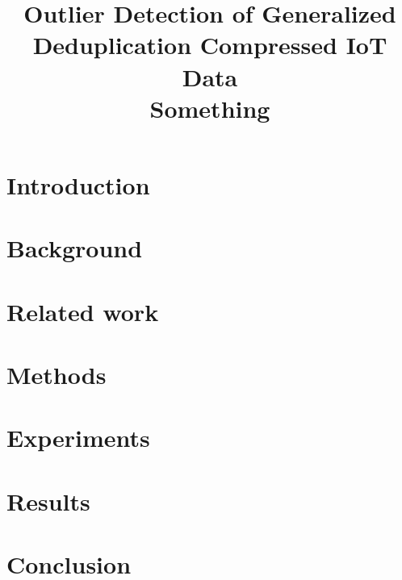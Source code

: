 \documentclass[conference]{IEEEtran}
\begin{document}
\title{Outlier Detection of Generalized Deduplication Compressed IoT Data\\
{\LARGE Something}\\
}

\author{
}

\maketitle
\thispagestyle{plain}
\pagestyle{plain}
\begin{abstract}
\end{abstract}

\begin{IEEEkeywords}
\end{IEEEkeywords}

\section{Introduction}


\section{Background}


\section{Related work}


\section{Methods}


\section{Experiments}


\section{Results}


\section{Conclusion}


\printbibliography[title={References}]
\end{document}
